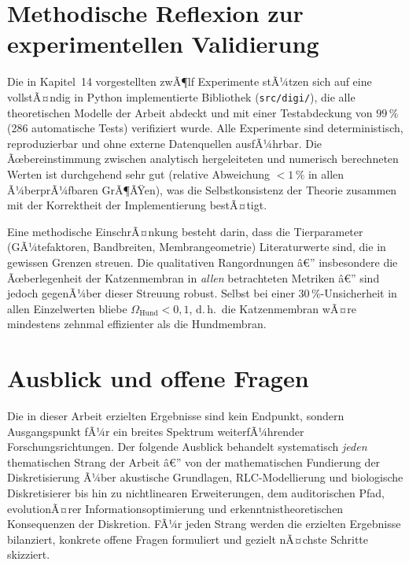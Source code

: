 ﻿\documentclass[12pt,a4paper,titlepage]{report}
\begin{document}
\section{Methodische Reflexion zur experimentellen Validierung}

Die in Kapitel~14 vorgestellten zwÃ¶lf Experimente stÃ¼tzen sich auf eine
vollstÃ¤ndig in Python implementierte Bibliothek (\texttt{src/digi/}),
die alle theoretischen Modelle der Arbeit abdeckt und mit einer
Testabdeckung von $99\,\%$ (286 automatische Tests) verifiziert wurde.
Alle Experimente sind deterministisch, reproduzierbar und ohne externe
Datenquellen ausfÃ¼hrbar.
Die Ãœbereinstimmung zwischen analytisch hergeleiteten und numerisch
berechneten Werten ist durchgehend sehr gut (relative Abweichung $<1\,\%$
in allen Ã¼berprÃ¼fbaren GrÃ¶ÃŸen), was die Selbstkonsistenz der Theorie
zusammen mit der Korrektheit der Implementierung bestÃ¤tigt.

Eine methodische EinschrÃ¤nkung besteht darin, dass die Tierparameter
(GÃ¼tefaktoren, Bandbreiten, Membrangeometrie) Literaturwerte sind,
die in gewissen Grenzen streuen.
Die qualitativen Rangordnungen â€” insbesondere die Ãœberlegenheit der
Katzenmembran in \emph{allen} betrachteten Metriken â€” sind jedoch
gegenÃ¼ber dieser Streuung robust.
Selbst bei einer $30\,\%$-Unsicherheit in allen Einzelwerten bliebe
$\Omega_{\mathrm{Hund}} < 0{,}1$, d.\,h.\ die Katzenmembran wÃ¤re
mindestens zehnmal effizienter als die Hundmembran.

\section{Ausblick und offene Fragen}

Die in dieser Arbeit erzielten Ergebnisse sind kein Endpunkt, sondern
Ausgangspunkt fÃ¼r ein breites Spektrum weiterfÃ¼hrender Forschungsrichtungen.
Der folgende Ausblick behandelt systematisch \emph{jeden} thematischen Strang
der Arbeit â€” von der mathematischen Fundierung der Diskretisierung Ã¼ber
akustische Grundlagen, RLC-Modellierung und biolo\-gische Diskretisierer
bis hin zu nichtlinearen Erweiterungen, dem auditorischen Pfad,
evolution\-Ã¤rer Informationsoptimierung und erkenntnistheoretischen Konsequenzen
der Diskretion. FÃ¼r jeden Strang werden die erzielten Ergebnisse bilanziert,
konkrete offene Fragen formuliert und gezielt nÃ¤chste Schritte skizziert.
\end{document}
